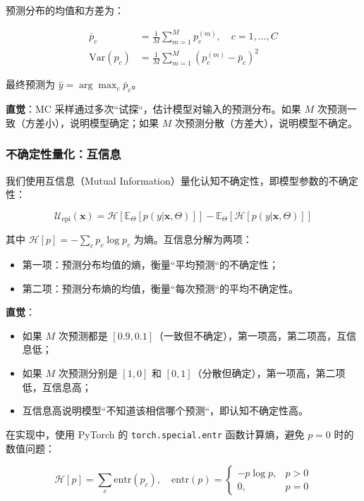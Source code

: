 预测分布的均值和方差为：

\begin{align}
\bar{p}_c &= \frac{1}{M} \sum_{m=1}^M p_c^{(m)}, \quad c=1,\ldots,C \\
\text{Var}(p_c) &= \frac{1}{M} \sum_{m=1}^M (p_c^{(m)} - \bar{p}_c)^2
\end{align}

最终预测为 $\hat{y} = \arg\max_c \bar{p}_c$。

\textbf{直觉}：MC 采样通过多次``试探``，估计模型对输入的预测分布。如果 $M$ 次预测一致（方差小），说明模型确定；如果 $M$ 次预测分散（方差大），说明模型不确定。

\subsubsection{不确定性量化：互信息}

我们使用互信息（Mutual Information）量化认知不确定性，即模型参数的不确定性：

\begin{equation}
\mathcal{U}_{\text{epi}}(\mathbf{x}) = \mathcal{H}\left[\mathbb{E}_{\Theta}[p(y|\mathbf{x},\Theta)]\right] - \mathbb{E}_{\Theta}\left[\mathcal{H}[p(y|\mathbf{x},\Theta)]\right]
\end{equation}

其中 $\mathcal{H}[p] = -\sum_c p_c \log p_c$ 为熵。互信息分解为两项：
\begin{itemize}
  \item 第一项：预测分布均值的熵，衡量``平均预测``的不确定性；
  \item 第二项：预测分布熵的均值，衡量``每次预测``的平均不确定性。
\end{itemize}

\textbf{直觉}：
\begin{itemize}
  \item 如果 $M$ 次预测都是 $[0.9, 0.1]$（一致但不确定），第一项高，第二项高，互信息低；
  \item 如果 $M$ 次预测分别是 $[1, 0]$ 和 $[0, 1]$（分散但确定），第一项高，第二项低，互信息高；
  \item 互信息高说明模型``不知道该相信哪个预测``，即认知不确定性高。
\end{itemize}

在实现中，使用 PyTorch 的 \texttt{torch.special.entr} 函数计算熵，避免 $p=0$ 时的数值问题：

\begin{equation}
\mathcal{H}[p] = \sum_c \text{entr}(p_c), \quad \text{entr}(p) = \begin{cases}
-p \log p, & p > 0 \\
0, & p = 0
\end{cases}
\end{equation}


